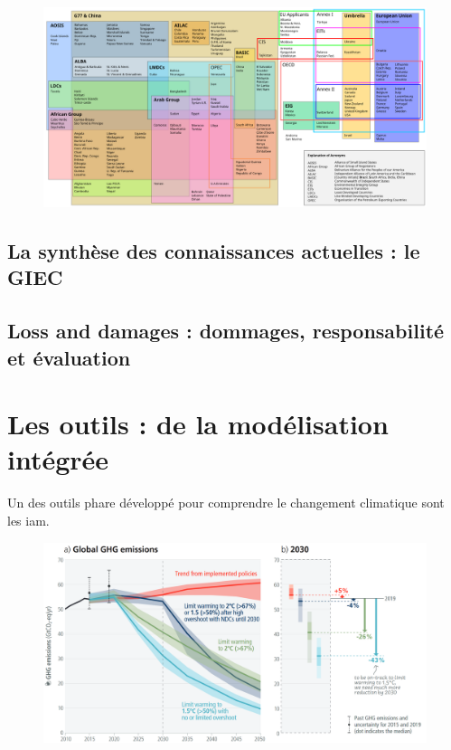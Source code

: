 \begin{figure}
    \centering
    \includegraphics[width=1\linewidth]{figures/UNFCCC_Party_Groupings.svg.png}
    \label{fig:COP}
\end{figure}

\subsection{La synthèse des connaissances actuelles : le GIEC}
\label{sect:1.2.3}

\subsection{Loss and damages : dommages, responsabilité et évaluation}
\label{sect:1.2.4}

\section{Les outils : de la modélisation intégrée}
\label{sect:1.3}

Un des outils phare développé pour comprendre le changement climatique sont les \gls{iam}.

\begin{figure}
    \centering
    \includegraphics[width=0.9\linewidth]{figures/spm2_5.png}
    \label{fig:ipcc-pathways}
\end{figure}



